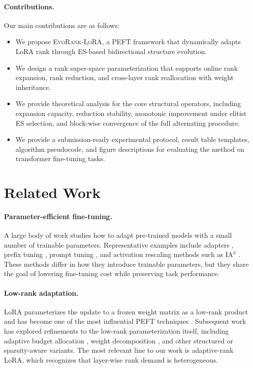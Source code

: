 \documentclass{article}
\newcommand{\method}{\textsc{EvoRank-LoRA}}
\begin{document}
\paragraph{Contributions.}
Our main contributions are as follows:
\begin{itemize}[leftmargin=1.2em]
    \item We propose \method, a PEFT framework that dynamically adapts LoRA rank through ES-based bidirectional structure evolution.
    \item We design a rank super-space parameterization that supports online rank expansion, rank reduction, and cross-layer rank reallocation with weight inheritance.
    \item We provide theoretical analysis for the core structural operators, including expansion capacity, reduction stability, monotonic improvement under elitist ES selection, and block-wise convergence of the full alternating procedure.
    \item We provide a submission-ready experimental protocol, result table templates, algorithm pseudocode, and figure descriptions for evaluating the method on transformer fine-tuning tasks.
\end{itemize}

\section{Related Work}
\label{sec:related}

\paragraph{Parameter-efficient fine-tuning.}
A large body of work studies how to adapt pre-trained models with a small number of trainable parameters. Representative examples include adapters \citep{houlsby2019adapter}, prefix tuning \citep{li2021prefix}, prompt tuning \citep{lester2021power}, and activation rescaling methods such as IA$^3$ \citep{liu2022fewshot}. These methods differ in how they introduce trainable parameters, but they share the goal of lowering fine-tuning cost while preserving task performance.

\paragraph{Low-rank adaptation.}
LoRA parameterizes the update to a frozen weight matrix as a low-rank product and has become one of the most influential PEFT techniques \citep{hu2022lora}. Subsequent work has explored refinements to the low-rank parameterization itself, including adaptive budget allocation \citep{zhang2023adalora}, weight decomposition \citep{liu2024dora}, and other structured or sparsity-aware variants. The most relevant line to our work is adaptive-rank LoRA, which recognizes that layer-wise rank demand is heterogeneous.
\end{document}

